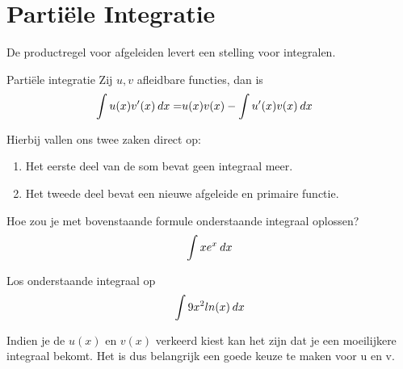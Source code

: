 \chapter{Parti\"ele Integratie}

De productregel voor afgeleiden levert een stelling voor integralen. \\


\begin{theorem}{Parti\"ele integratie}
	Zij $u,v$ afleidbare functies, dan is
	\begin{eqnarray}
	\int u(x)v'(x)\hspace{2pt}dx  = & u(x)v(x) -  \int u'(x)v(x) \hspace{2pt}dx 
	\end{eqnarray}

	
	 
\end{theorem}

Hierbij vallen ons twee zaken direct op:

\begin{enumerate}
	\item Het eerste deel van de som bevat geen integraal meer.
	\item Het tweede deel bevat een nieuwe afgeleide en primaire functie.
\end{enumerate}

\begin{exercise}
	Hoe zou je met bovenstaande formule onderstaande integraal oplossen?
	\[ \int  xe^x\hspace{2pt}dx \]
\iftoggle{solution}{%
	Stel $u(x) = x $ en $u'(x) = 1$ en stel $v'(x) = e^x$ zodat $v(x) = e^x$. 
	Parti\"ele integratie geeft dan
	
	\[ \int xe^x\dx = xe^x -   \int e^x\dx = xe^x - e^x + C , C \in \mathbb{R}\]
}{%
}	


\end{exercise}

\begin{exercise}
	Los onderstaande integraal op
	\[ \int  9x^2 ln(x)\hspace{2pt}dx \]
	\iftoggle{solution}{%
		Stel $u(x) = ln(x) $ en $u'(x) = \frac{1}{x}$ en stel $v'(x) = 9x^2$ zodat $v(x) = 3x^2$. 
		Parti\"ele integratie geeft dan
		
		\[ \int 9x^2 ln(x)\dx = ln(x)3x^2 -   \int \frac{1}{x}3x^2\dx  = 3x^3ln(x) - x^3+ C , C \in \mathbb{R}\]
	}{%
	}	
	
\end{exercise}

Indien je de $u(x)$ en $v(x)$ verkeerd kiest kan het zijn dat je een moeilijkere integraal bekomt. Het is dus belangrijk een goede keuze te maken voor u en v.

